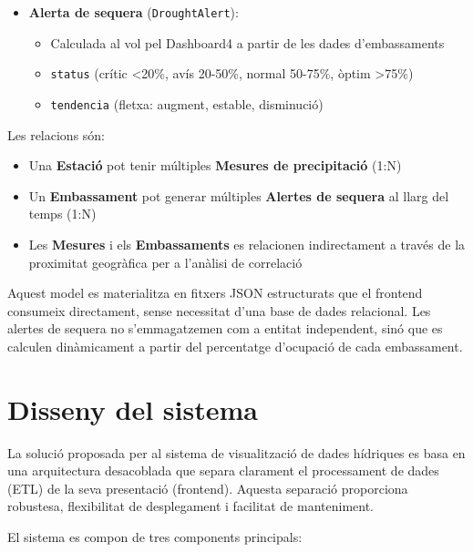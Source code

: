 \begin{itemize}
    \item \textbf{Alerta de sequera} (\texttt{DroughtAlert}):
    \begin{itemize}
        \item Calculada al vol pel Dashboard4 a partir de les dades d'embassaments
        \item \texttt{status} (crític \textless20\%, avís 20-50\%, normal 50-75\%, òptim \textgreater75\%)
        \item \texttt{tendencia} (fletxa: augment, estable, disminució)
    \end{itemize}
\end{itemize}

Les relacions són:
\begin{itemize}
    \item Una \textbf{Estació} pot tenir múltiples \textbf{Mesures de precipitació} (1:N)
    \item Un \textbf{Embassament} pot generar múltiples \textbf{Alertes de sequera} al llarg del temps (1:N)
    \item Les \textbf{Mesures} i els \textbf{Embassaments} es relacionen indirectament a través de la proximitat geogràfica per a l'anàlisi de correlació
\end{itemize}

Aquest model es materialitza en fitxers JSON estructurats que el frontend consumeix directament, sense necessitat d'una base de dades relacional. Les alertes de sequera no s'emmagatzemen com a entitat independent, sinó que es calculen dinàmicament a partir del percentatge d'ocupació de cada embassament.


\section{Disseny del sistema}

La solució proposada per al sistema de visualització de dades hídriques es basa en una arquitectura desacoblada que separa clarament el processament de dades (ETL) de la seva presentació (frontend). Aquesta separació proporciona robustesa, flexibilitat de desplegament i facilitat de manteniment.

El sistema es compon de tres components principals:

